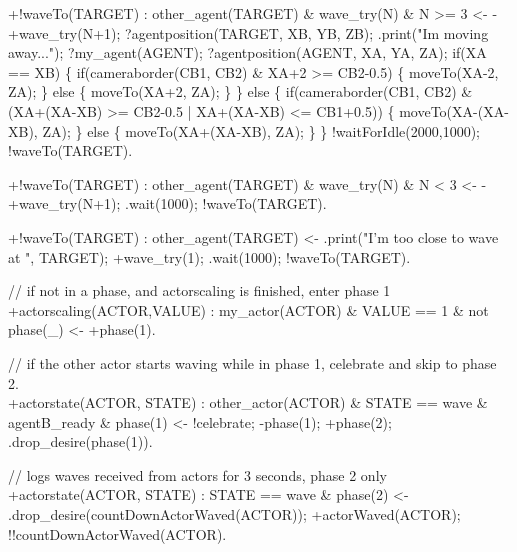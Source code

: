 \documentclass[draft,final]{vutinfth} %
\begin{document}
{+!waveTo(TARGET) :  other\_agent(TARGET) \& wave\_try(N) \& N >= 3
                    <-  -+wave\_try(N+1);
                        ?agentposition(TARGET, XB, YB, ZB);
                        .print("Im moving away...");
                        ?my\_agent(AGENT);
                        ?agentposition(AGENT, XA, YA, ZA);
                        if(XA == XB)
                        \{
                            if(cameraborder(CB1, CB2) \& XA+2 >= CB2-0.5)
                            \{
                                moveTo(XA-2, ZA);     
                            \}
                            else
                            \{
                                moveTo(XA+2, ZA);     
                            \}
                        \}
                        else
                        \{
                            if(cameraborder(CB1, CB2) \& (XA+(XA-XB) >= CB2-0.5 | XA+(XA-XB) <= CB1+0.5))
                            \{
                                moveTo(XA-(XA-XB), ZA);     
                            \}
                            else
                            \{
                                moveTo(XA+(XA-XB), ZA);     
                            \}
                        \}
                        !waitForIdle(2000,1000);
                        !waveTo(TARGET).

+!waveTo(TARGET) :  other\_agent(TARGET) \& wave\_try(N) \& N < 3
                    <-  -+wave\_try(N+1);
                        .wait(1000);
                        !waveTo(TARGET).

+!waveTo(TARGET) :  other\_agent(TARGET)
                    <-  .print("I'm too close to wave at ", TARGET);
                        +wave\_try(1);
                        .wait(1000);
                        !waveTo(TARGET).

// if not in a phase, and actorscaling is finished, enter phase 1\\
+actorscaling(ACTOR,VALUE) : my\_actor(ACTOR) \& VALUE == 1 \& not phase(\_)
                    <-  +phase(1).

// if the other actor starts waving while in phase 1, celebrate and skip to phase 2.\\
+actorstate(ACTOR, STATE) : other\_actor(ACTOR) \& STATE == wave \& agentB\_ready \& phase(1)
                    <- 	!celebrate;
                        -phase(1);
                        +phase(2);
                        .drop\_desire(phase(1)).

// logs waves received from actors for 3 seconds, phase 2 only\\
+actorstate(ACTOR, STATE) : STATE == wave \& phase(2)
                    <-  .drop\_desire(countDownActorWaved(ACTOR));
                        +actorWaved(ACTOR);
                        !!countDownActorWaved(ACTOR).

}
\end{document}
